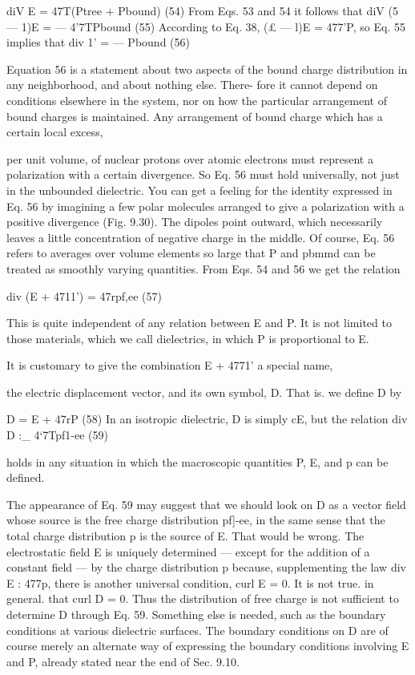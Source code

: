 {{\begin{equation}
\end{equation}
diV E = 47T(Ptree + Pbound) (54)
From Eqs. 53 and 54 it follows that
diV (5  ---  1)E =  --- 4'7TPbound (55)
According to Eq. 38, (£  ---  l)E = 477'P, so Eq. 55 implies that
div 1' =  --- Pbound (56)

Equation 56 is a statement about two aspects of the bound charge
distribution in any neighborhood, and about nothing else. There-
fore it cannot depend on conditions elsewhere in the system, nor
on how the particular arrangement of bound charges is maintained.
Any arrangement of bound charge which has a certain local excess,

per unit volume, of nuclear protons over atomic electrons must
represent a polarization with a certain divergence. So Eq. 56 must
hold universally, not just in the unbounded dielectric. You can get
a feeling for the identity expressed in Eq. 56 by imagining a few polar
molecules arranged to give a polarization with a positive divergence
(Fig. 9.30). The dipoles point outward, which necessarily leaves a
little concentration of negative charge in the middle. Of course,
Eq. 56 refers to averages over volume elements so large that P and
pbmmd can be treated as smoothly varying quantities.
From Eqs. 54 and 56 we get the relation

\begin{equation}
\end{equation}
div (E + 4711') = 47rpf,ee (57)

This is quite independent of any relation between E and P. It is not
limited to those materials, which we call dielectrics, in which P is
proportional to E.

It is customary to give the combination E + 4771' a special name,

the electric displacement vector, and its own symbol, D. That is. we
define D by

\begin{equation}
\end{equation}
D = E + 47rP (58)
In an isotropic dielectric, D is simply cE, but the relation
div D :_ 4‘7Tpf1-ee (59)

holds in any situation in which the macroscopic quantities P, E, and
p can be defined.

The appearance of Eq. 59 may suggest that we should look on D
as a vector field whose source is the free charge distribution pf]-ee, in
the same sense that the total charge distribution p is the source of E.
That would be wrong. The electrostatic field E is uniquely determined
--- except for the addition of a constant field --- by the charge
distribution p because, supplementing the law div E : 477p, there
is another universal condition, curl E = 0. It is not true. in general.
that curl D = 0. Thus the distribution of free charge is not sufficient
to determine D through Eq. 59. Something else is needed, such as
the boundary conditions at various dielectric surfaces. The boundary
conditions on D are of course merely an alternate way of expressing
the boundary conditions involving E and P, already stated near
the end of Sec. 9.10.

}}
